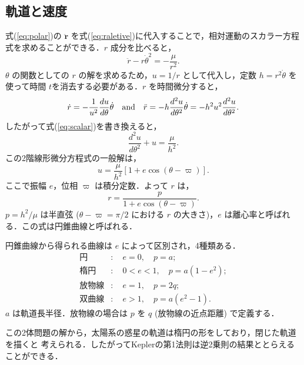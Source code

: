 \documentclass[11pt,a4paper,oneside,onecolumn]{jreport}
\begin{document}
\subsection{軌道と速度 \label{sec:position&velocity}}
式(\ref{eq:polar})の $\ddot{{\bm r}}$ を式(\ref{eq:raletive})に代入することで，相対運動のスカラー方程式を求めることができる．$r$ 成分を比べると，
\begin{equation}
\ddot{r} - r \dot{\theta}^2 = - \frac{\mu}{r^2}. \label{eq:scalar}
\end{equation}
$\theta$ の関数としての $r$ の解を求めるため，$u = 1/r$ として代入し，定数 $h = r^2 \dot{\theta}$ を使って時間 $t$を消去する必要がある．$r$ を時間微分すると，
\begin{equation}
\dot{r} = - \frac{1}{u^2} \frac{du}{d \theta} \dot{\theta} \quad {\rm and} \quad \ddot{r} = - h \frac{d^2 u}{d \theta^2} \dot{\theta} = - h^2 u^2 \frac{d^2 u}{d \theta^2}. 
\end{equation}
したがって式(\ref{eq:scalar})を書き換えると，
\begin{equation}
\frac{d^2 u}{d \theta^2} + u = \frac{\mu}{h^2}.
\end{equation}
この2階線形微分方程式の一般解は，
\begin{equation}
u =\frac{\mu}{h^2} \left[ 1+ e \cos (\theta - \varpi) \right].
\end{equation}
ここで振幅 $e$，位相 $\varpi$ は積分定数．よって $r$ は，
\begin{equation}
r =\frac{p}{1+ e \cos (\theta - \varpi)}.
\end{equation}
$p = h^2 / \mu$ は半直弦 ($\theta - \varpi = \pi / 2$ における $r$ の大きさ)，$e$ は離心率と呼ばれる．この式は円錐曲線と呼ばれる．

円錐曲線から得られる曲線は $e$ によって区別され，4種類ある．
\begin{equation}
\begin{split}
円 &: \quad e = 0, \quad p = a; \\
楕円 &: \quad 0 < e < 1, \quad p = a(1-e^2); \\
放物線 &: \quad e = 1, \quad p = 2q; \\
双曲線 &: \quad e > 1, \quad p = a(e^2-1). 
\end{split}
\end{equation}
$a$ は軌道長半径．放物線の場合は $p$ を $q$ (放物線の近点距離) で定義する．

この2体問題の解から，太陽系の惑星の軌道は楕円の形をしており，閉じた軌道を描くと
考えられる．したがってKeplerの第1法則は逆2乗則の結果ととらえることができる．
\end{document}
